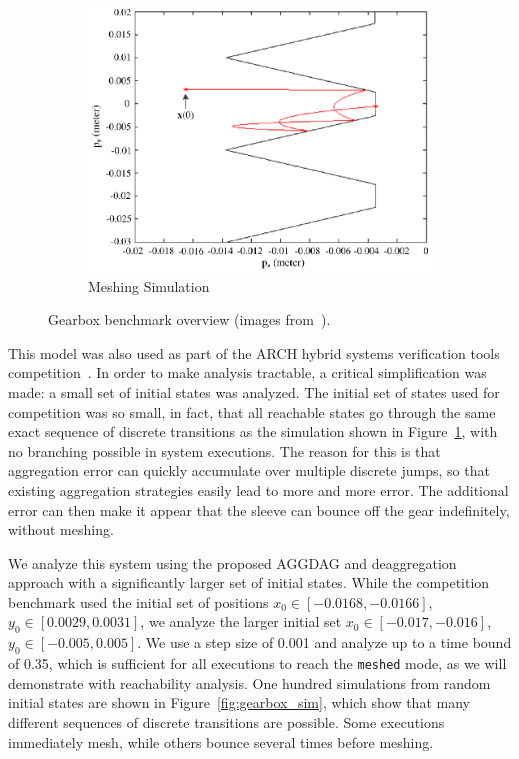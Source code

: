 \begin{figure}[t]
\begin{subfigure}{0.3\textwidth}
    \includegraphics[width=1.0\textwidth]{images/gb_overview3.png}
    \caption{Meshing Simulation}\label{fig:gbo_3}
\end{subfigure}
\caption{Gearbox benchmark overview (images from~\cite{chen2014motor}).}\label{fig:gb_overview}
\end{figure}

This model was also used as part of the ARCH hybrid systems verification tools competition~\cite{archcomp19}.
%
In order to make analysis tractable, a critical simplification was made: a small set of initial states was analyzed.
%
The initial set of states used for competition was so small, in fact, that all reachable states go through the
same exact sequence of discrete transitions as the simulation shown in Figure~\ref{fig:gbo_3}, with no branching possible in system executions.
%
The reason for this is that aggregation error can quickly accumulate over multiple discrete jumps, so that existing aggregation strategies
easily lead to more and more error.
%
The additional error can then make it appear that the sleeve can bounce off the gear indefinitely, without meshing.

We analyze this system using the proposed AGGDAG and deaggregation approach with a significantly larger set of initial states.
%
While the competition benchmark used the initial set of positions $x_0 \in [-0.0168, -0.0166]$, $y_0 \in [0.0029, 0.0031]$, we
analyze the larger initial set $x_0 \in [-0.017, -0.016]$, $y_0 \in [-0.005, 0.005]$.
%
We use a step size of 0.001 and analyze up to a time bound of 0.35, which is sufficient for all executions to reach the \texttt{meshed} mode,
as we will demonstrate with reachability analysis.
%
One hundred simulations from random initial states are shown in Figure~\ref{fig:gearbox_sim}, which show that many different
sequences of discrete transitions are possible. Some executions immediately mesh, while others bounce several times before meshing.

